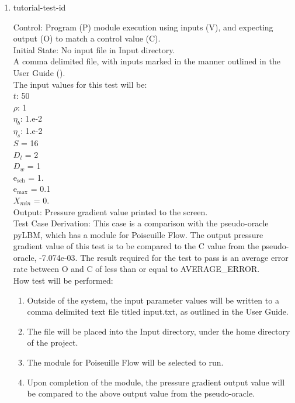 \documentclass[12pt, titlepage]{article}
\newcounter{testcounter} %
\begin{document}
\begin{enumerate}

\item{tutorial-test-id\thetestcounter \\}

Control: Program (P) module execution using inputs (V), and expecting output (O) to match a control value (C).\\
					
Initial State: No input file in Input directory.\\
					
A comma delimited file, with inputs marked in the manner outlined in the User Guide (\citet{LBM_UserGuide_PM}).\\The input values for this test will be:\\
$t$: 50\\
$\rho$: 1\\
$\eta_b$: 1.e-2\\
$\eta_s$: 1.e-2\\
$S$ = 16\\
$D_{l}$ = 2\\
$D_{w}$ = 1\\
$\mathrm{e_{sch}}$ = 1.\\
$\mathrm{e_{max}}$ = 0.1\\
$X_{min}$ = 0.\\

					
Output: Pressure gradient value printed to the screen.  \\

Test Case Derivation: This case is a comparison with the pseudo-oracle pyLBM, which has a module for Poiseuille Flow. The output pressure gradient value of this test is to be compared to the C value from the pseudo-oracle, -7.074e-03. The result required for the test to pass is an average error rate between O and C of less than or equal to AVERAGE\_ERROR.\\

					
How test will be performed: 

\begin{enumerate}
\item Outside of the system, the input parameter values will be written to a comma delimited text file titled input.txt, as outlined in the User Guide.
\item The file will be placed into the Input directory, under the home directory of the project.
\item The module for Poiseuille Flow will be selected to run.
\item Upon completion of the module, the pressure gradient output value will be compared to the above output value from the pseudo-oracle.
\end{enumerate}			


\end{enumerate}
\end{document}
